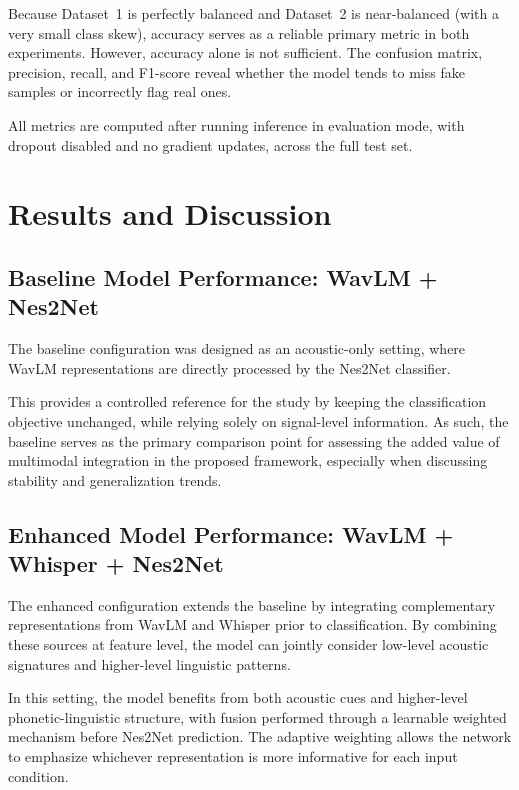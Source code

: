 \documentclass[11pt,a4paper]{article}
\begin{document}
Because Dataset~1 is perfectly balanced and Dataset~2 is near-balanced (with a
very small class skew), accuracy serves as a reliable primary metric in both
experiments. However, accuracy alone is not sufficient. The confusion matrix,
precision, recall, and F1-score reveal whether the model tends to miss fake
samples or incorrectly flag real ones.

All metrics are computed after running inference in evaluation mode, with dropout
disabled and no gradient updates, across the full test set.

\section{Results and Discussion}

\subsection{Baseline Model Performance: WavLM + Nes2Net}

The baseline configuration was designed as an acoustic-only setting, where WavLM
representations are directly processed by the Nes2Net classifier.

This provides a controlled reference for the study by keeping the classification
objective unchanged, while relying solely on signal-level information. As such,
the baseline serves as the primary comparison point for assessing the added value
of multimodal integration in the proposed framework, especially when discussing
stability and generalization trends.

\subsection{Enhanced Model Performance: WavLM + Whisper + Nes2Net}

The enhanced configuration extends the baseline by integrating complementary
representations from WavLM and Whisper prior to classification. By combining these
sources at feature level, the model can jointly consider low-level acoustic
signatures and higher-level linguistic patterns.

In this setting, the model benefits from both acoustic cues and higher-level
phonetic-linguistic structure, with fusion performed through a learnable weighted
mechanism before Nes2Net prediction. The adaptive weighting allows the network to
emphasize whichever representation is more informative for each input condition.
\end{document}
